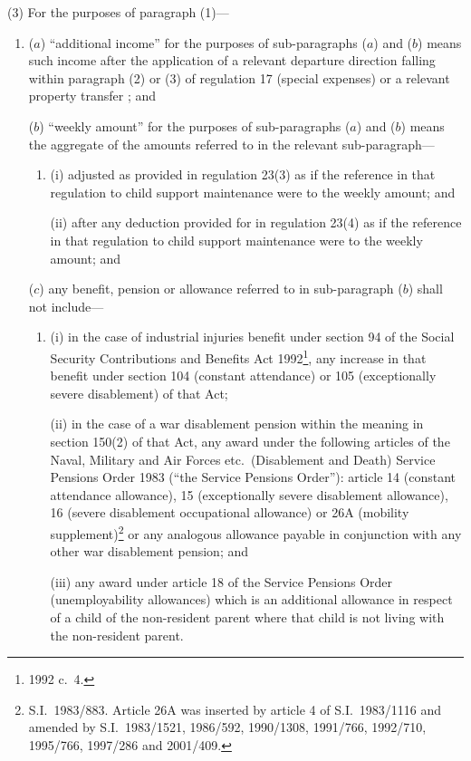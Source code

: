 \documentclass[12pt,a4paper]{article}
\begin{document}
(3) For the purposes of paragraph (1)—
\begin{enumerate}\item[]
($a$) “additional income” for the purposes of sub-paragraphs ($a$)  and ($b$)  means such income after the application of a relevant departure direction falling within paragraph (2) or (3) of regulation 17 (special expenses)
or a relevant property transfer%
; and

($b$) “weekly amount” for the purposes of sub-paragraphs ($a$)  and ($b$)  means the aggregate of the amounts referred to in the relevant sub-paragraph—
\begin{enumerate}\item[]
(i) adjusted as provided in regulation 23(3) as if the reference in that regulation to child support maintenance were to the weekly amount; and

(ii) after any deduction provided for in regulation 23(4) as if the reference in that regulation to child support maintenance were to the weekly amount; and
\end{enumerate}

($c$) 
any benefit, pension or allowance referred to in sub-paragraph ($b$)  shall not include—
\begin{enumerate}\item[]
(i) 
in the case of industrial injuries benefit under section 94 of the Social Security Contributions and Benefits Act 1992\footnote{1992 c.\ 4.}, any increase in that benefit under section 104 (constant attendance) or 105 (exceptionally severe disablement) of that Act;

(ii) 
in the case of a war disablement pension within the meaning in section 150(2) of that Act, any award under the following articles of the Naval, Military and Air Forces etc.\ (Disablement and Death) Service Pensions Order 1983 (“the Service Pensions Order”): article 14 (constant attendance allowance), 15 (exceptionally severe disablement allowance), 16 (severe disablement occupational allowance) or 26A (mobility supplement)\footnote{S.I.\ 1983/883. Article 26A was inserted by article 4 of S.I.\ 1983/1116 and amended by S.I.\ 1983/1521, 1986/592, 1990/1308, 1991/766, 1992/710, 1995/766, 1997/286 and 2001/409.} or any analogous allowance payable in conjunction with any other war disablement pension; and

(iii) 
any award under article 18 of the Service Pensions Order (unemployability allowances) which is an additional allowance in respect of a child of the non-resident parent where that child is not living with the non-resident parent.
\end{enumerate}
\end{enumerate}
\end{document}
